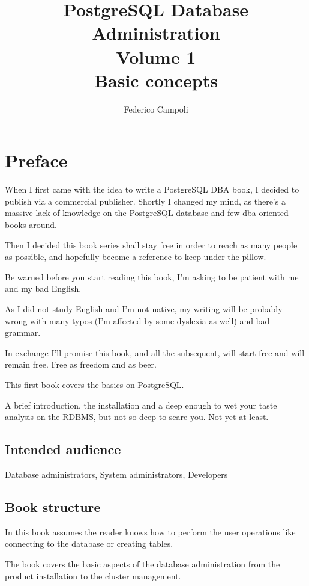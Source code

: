 \documentclass[oneside]{book}
\author{Federico Campoli}
\title{PostgreSQL Database Administration \\ Volume 1 \\ Basic concepts}
\begin{document}

\maketitle

\newpage{}



\tableofcontents{}

\chapter*{Preface}
When I first came with the idea to write a PostgreSQL DBA book, I decided
to publish via a commercial publisher. 
Shortly I changed my mind, as there's a massive lack of knowledge on the
PostgreSQL database and few dba oriented books around.

Then I decided this book series shall stay free in order to reach as many people
as
possible, and hopefully become a reference to keep under the pillow.

Be warned before you start reading this book, I'm asking to be patient with me
and my bad English.

As I did not study English and I'm not native, my writing will be probably wrong
with many typos (I'm affected by some dyslexia as well) and bad grammar. 

In exchange I'll promise this book, and all the subsequent, will start free and
will remain
free. Free as freedom and as beer. 

This first book covers the basics on PostgreSQL.

A brief introduction, the installation and a deep enough to wet your taste
analysis on the RDBMS, but not so deep to scare you. Not yet at least.




\section*{Intended audience}
Database administrators, System administrators, Developers

\section*{Book structure}
In this book assumes the reader knows how to perform the user operations like 
connecting to the database or creating tables.

The book covers the basic aspects of the database administration from the 
product installation to the cluster management.
\end{document}
